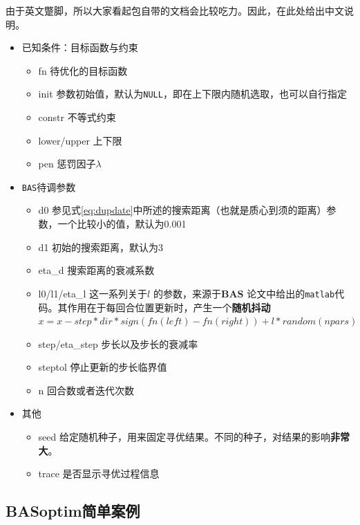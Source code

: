 \documentclass[]{ctexbook}
\providecommand{\tightlist}{%
  \setlength{\itemsep}{0pt}\setlength{\parskip}{0pt}}
\theoremstyle{definition}
\theoremstyle{definition}
\theoremstyle{definition}
\theoremstyle{remark}
\begin{document}
由于英文蹩脚，所以大家看起包自带的文档会比较吃力。因此，在此处给出中文说明。

\begin{itemize}
\tightlist
\item
  已知条件：目标函数与约束

  \begin{itemize}
  \tightlist
  \item
    fn 待优化的目标函数
  \item
    init
    参数初始值，默认为\texttt{NULL}，即在上下限内随机选取，也可以自行指定
  \item
    constr 不等式约束
  \item
    lower/upper 上下限
  \item
    pen 惩罚因子\(\lambda\)
  \end{itemize}
\item
  \texttt{BAS}待调参数

  \begin{itemize}
  \tightlist
  \item
    d0
    参见式\eqref{eq:dupdate}中所述的搜索距离（也就是质心到须的距离）参数，一个比较小的值，默认为0.001
  \item
    d1 初始的搜索距离，默认为3
  \item
    eta\_d 搜索距离的衰减系数
  \item
    l0/l1/eta\_l 这一系列关于\(l\) 的参数，来源于\textbf{BAS}
    \citep{Jiang2017BAS}论文中给出的\texttt{matlab}代码。其作用在于每回合位置更新时，产生一个\textbf{随机抖动}\(x = x - step * dir * sign(fn(left) - fn(right)) + l *random(npars)\)
  \item
    step/eta\_step 步长以及步长的衰减率
  \item
    steptol 停止更新的步长临界值
  \item
    n 回合数或者迭代次数
  \end{itemize}
\item
  其他

  \begin{itemize}
  \tightlist
  \item
    seed
    给定随机种子，用来固定寻优结果。不同的种子，对结果的影响\textbf{非常大}。
  \item
    trace 是否显示寻优过程信息
  \end{itemize}
\end{itemize}

\subsection{BASoptim简单案例}\label{BASexamples}
\end{document}
